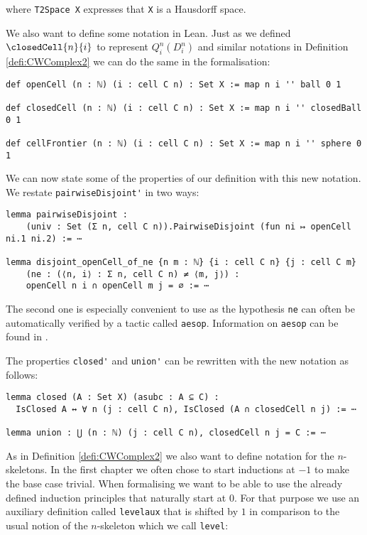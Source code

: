 where \lstinline{T2Space X} expresses that \lstinline{X} is a Hausdorff space.

We also want to define some notation in Lean. 
Just as we defined $\closedCell{n}{i}$ to represent $Q^n_i(D_i^n)$ and similar notations in Definition \ref{defi:CWComplex2} we can do the same in the formalisation: 

\begin{lstlisting}
def openCell (n : ℕ) (i : cell C n) : Set X := map n i '' ball 0 1

def closedCell (n : ℕ) (i : cell C n) : Set X := map n i '' closedBall 0 1

def cellFrontier (n : ℕ) (i : cell C n) : Set X := map n i '' sphere 0 1
\end{lstlisting}

We can now state some of the properties of our definition with this new notation. 
We restate \lstinline{pairwiseDisjoint'} in two ways:

\begin{lstlisting}
lemma pairwiseDisjoint :
    (univ : Set (Σ n, cell C n)).PairwiseDisjoint (fun ni ↦ openCell ni.1 ni.2) := ⋯

lemma disjoint_openCell_of_ne {n m : ℕ} {i : cell C n} {j : cell C m}
    (ne : (⟨n, i⟩ : Σ n, cell C n) ≠ ⟨m, j⟩) : 
    openCell n i ∩ openCell m j = ∅ := ⋯
\end{lstlisting}

The second one is especially convenient to use as the hypothesis \lstinline{ne} can often be automatically verified by a tactic called \lstinline{aesop}. 
Information on \lstinline{aesop} can be found in \cite{Limperg2023}. 

The properties \lstinline{closed'} and \lstinline{union'} can be rewritten with the new notation as follows: 

\begin{lstlisting}
lemma closed (A : Set X) (asubc : A ⊆ C) :
  IsClosed A ↔ ∀ n (j : cell C n), IsClosed (A ∩ closedCell n j) := ⋯

lemma union : ⋃ (n : ℕ) (j : cell C n), closedCell n j = C := ⋯
\end{lstlisting}

As in Definition \ref{defi:CWComplex2} we also want to define notation for the $n$-skeletons. 
In the first chapter we often chose to start inductions at $-1$ to make the base case trivial. 
When formalising we want to be able to use the already defined induction principles that naturally start at $0$.
For that purpose we use an auxiliary definition called \lstinline{levelaux} that is shifted by $1$ in comparison to the usual notion of the $n$-skeleton which we call \lstinline{level}: 

